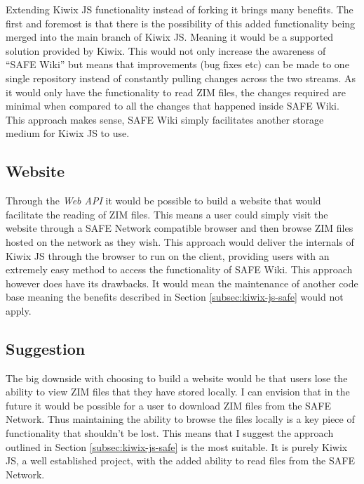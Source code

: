Extending Kiwix JS functionality instead of forking it brings many benefits. The first and foremost is that there is the possibility of this added functionality being merged into the main branch of Kiwix JS. Meaning it would be a supported solution provided by Kiwix. This would not only increase the awareness of ``SAFE Wiki'' but means that improvements (bug fixes etc) can be made to one single repository instead of constantly pulling changes across the two streams. As it would only have the functionality to read ZIM files, the changes required are minimal when compared to all the changes that happened inside SAFE Wiki. This approach makes sense, SAFE Wiki simply facilitates another storage medium for Kiwix JS to use.

\subsection{Website}

Through the \textit{Web API} it would be possible to build a website that would facilitate the reading of ZIM files. This means a user could simply visit the website through a SAFE Network compatible browser and then browse ZIM files hosted on the network as they wish. This approach would deliver the internals of Kiwix JS through the browser to run on the client, providing users with an extremely easy method to access the functionality of SAFE Wiki. This approach however does have its drawbacks. It would mean the maintenance of another code base meaning the benefits described in Section \ref{subsec:kiwix-js-safe} would not apply.

\subsection{Suggestion}

The big downside with choosing to build a website would be that users lose the ability to view ZIM files that they have stored locally. I can envision that in the future it would be possible for a user to download ZIM files from the SAFE Network. Thus maintaining the ability to browse the files locally is a key piece of functionality that shouldn't be lost. This means that I suggest the approach outlined in Section \ref{subsec:kiwix-js-safe} is the most suitable. It is purely Kiwix JS, a well established project, with the added ability to read files from the SAFE Network.







